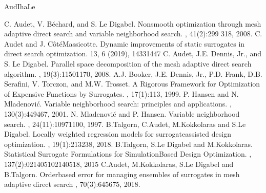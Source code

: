 \documentclass[letterpaper,10pt,english]{sphinxmanual}
\begin{document}
\begin{sphinxthebibliography}{AudIhaLe}
\begin{enumerate}
\end{enumerate}
\sphinxAtStartPar
C. Audet, V. Béchard, and S. Le Digabel.
Nonsmooth optimization through mesh adaptive direct search and variable neighborhood search.
, 41(2):299\textendash{} 318, 2008.
\sphinxAtStartPar
C. Audet and J. Côté\sphinxhyphen{}Massicotte.
Dynamic improvements of static surrogates in direct search optimization.
 13, 6 (2019), 1433\sphinxhyphen{}1447
\sphinxAtStartPar
C. Audet, J.E. Dennis, Jr., and S. Le Digabel.
Parallel space decomposition of the mesh adaptive direct search algorithm.
, 19(3):1150\textendash{}1170, 2008.
\sphinxAtStartPar
A.J. Booker, J.E. Dennis, Jr., P.D. Frank, D.B. Serafini, V. Torczon, and M.W. Trosset.
A Rigorous Framework for Optimization of Expensive Functions by Surrogates.
, 17(1):1\textendash{}13, 1999.
\sphinxAtStartPar
P. Hansen and N. Mladenović.
Variable neighborhood search: principles and applications.
, 130(3):449\textendash{}467, 2001.
\sphinxAtStartPar
N. Mladenović and P. Hansen.
Variable neighborhood search.
, 24(11):1097\textendash{}1100, 1997.
\sphinxAtStartPar
B.Talgorn, C.Audet, M.Kokkolaras and S.Le Digabel.
Locally weighted regression models for surrogate\sphinxhyphen{}assisted design optimization.
, 19(1):213\textendash{}238, 2018.
\sphinxAtStartPar
B.Talgorn, S.Le Digabel and M.Kokkolaras.
Statistical Surrogate Formulations for Simulation\sphinxhyphen{}Based Design Optimization.
, 137(2):021405\textendash{}1\textendash{}021405\textendash{}18, 2015
\sphinxAtStartPar
C.Audet, M.Kokkolaras, S.Le Digabel and B.Talgorn.
Order\sphinxhyphen{}based error for managing ensembles of surrogates in mesh adaptive direct search
, 70(3):645\textendash{}675, 2018.

\end{sphinxthebibliography}
\end{document}
